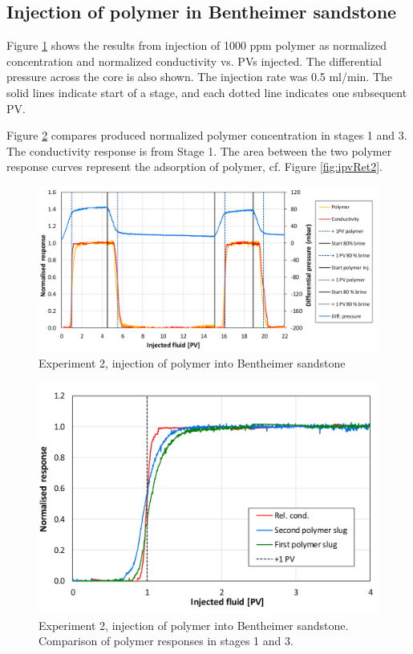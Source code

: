 \subsection{Injection of polymer in Bentheimer sandstone}
Figure \ref{cht:injexp2} shows the results from injection of 1000 ppm polymer as normalized concentration and normalized conductivity vs. PVs injected. The differential pressure across the core is also shown. The injection rate was 0.5 ml/min. The solid lines indicate start of a stage, and each dotted line indicates one subsequent PV. 

Figure \ref{cht:injexp2Comp1-3} compares produced normalized polymer concentration in stages 1 and 3. The conductivity response is from Stage 1. The area between the two polymer response curves represent the adsorption of polymer, cf. Figure \ref{fig:ipvRet2}.

\begin{figure}[h]
    \centering
    \includegraphics[width=\textwidth]{img/cht/injexp2bent.png}
    \caption{Experiment 2, injection of polymer into Bentheimer sandstone}
    \label{cht:injexp2}
\end{figure}

\begin{figure}[h!   ]
    \centering
    \includegraphics[width=\textwidth]{img/cht/injexp2bentComp1-3.png}
    \caption{Experiment 2, injection of polymer into Bentheimer sandstone. Comparison of polymer responses in stages 1 and 3.}
    \label{cht:injexp2Comp1-3}
\end{figure}


